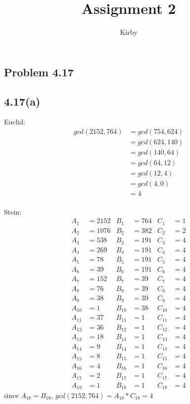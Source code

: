 \documentclass[acmlarge,screen]{acmart}
\begin{document}
\begin{CJK*}{UTF8}{gbsn}
\title{Assignment 2}
\author{Kirby}
\maketitle
\section{Problem 4.17}
\subsection{4.17(a)}
\begin{multicols}{2}
Euclid:
\begin{align*}
	gcd(2152, 764) &= gcd(754, 624)\\
	&= gcd(624, 140)\\
	&= gcd(140, 64)\\
	&= gcd(64, 12)\\
	&= gcd(12, 4)\\
	&= gcd(4, 0)\\
	&= 4
\end{align*}
\columnbreak \\
Stein:
\begin{align*}
	A_1&=2152 & B_1&=764 & C_1&=1\\
	A_2&=1076 & B_2&=382 & C_2&=2\\
	A_3&=538 & B_3&=191 & C_3&=4\\
	A_4&=269 & B_4&=191 & C_4&=4\\
	A_5&=78 & B_5&=191 & C_5&=4\\
	A_6&=39 & B_6&=191 & C_6&=4\\
	A_7&=152 & B_7&=39 & C_7&=4\\
	A_8&=76 & B_8&=39 & C_8&=4\\
	A_9&=38 & B_9&=39 & C_9&=4\\
	A_{10}&=1 & B_{10}&=38 & C_{10}&=4\\
	A_{11}&=37 & B_{11}&=1 & C_{11}&=4\\
	A_{12}&=36 & B_{12}&=1 & C_{12}&=4\\
	A_{13}&=18 & B_{13}&=1 & C_{13}&=4\\
	A_{14}&=9 & B_{14}&=1 & C_{14}&=4\\
	A_{15}&=8 & B_{15}&=1 & C_{15}&=4\\
	A_{16}&=4 & B_{16}&=1 & C_{16}&=4\\
	A_{17}&=2 & B_{17}&=1 & C_{17}&=4\\
	A_{18}&=1 & B_{18}&=1 & C_{18}&=4
\end{align*}
since $A_{18}=B_{18}$, $gcd(2152, 764)=A_{18}*C_{18}=4$
\end{multicols}

\end{CJK*}
\end{document}
